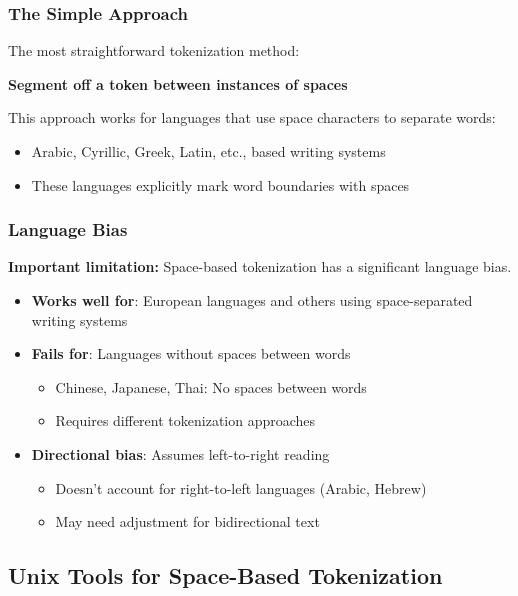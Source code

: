 \documentclass[11pt,a4paper]{article}
\theoremstyle{definition}
\theoremstyle{plain}
\theoremstyle{remark}
\begin{document}
\subsubsection{The Simple Approach}

The most straightforward tokenization method:

\textbf{Segment off a token between instances of spaces}

This approach works for languages that use space characters to separate words:
\begin{itemize}
    \item Arabic, Cyrillic, Greek, Latin, etc., based writing systems
    \item These languages explicitly mark word boundaries with spaces
\end{itemize}

\subsubsection{Language Bias}

\textbf{Important limitation:} Space-based tokenization has a significant language bias.

\begin{itemize}
    \item \textbf{Works well for}: European languages and others using space-separated writing systems
    \item \textbf{Fails for}: Languages without spaces between words
    \begin{itemize}
        \item Chinese, Japanese, Thai: No spaces between words
        \item Requires different tokenization approaches
    \end{itemize}
    \item \textbf{Directional bias}: Assumes left-to-right reading
    \begin{itemize}
        \item Doesn't account for right-to-left languages (Arabic, Hebrew)
        \item May need adjustment for bidirectional text
    \end{itemize}
\end{itemize}

\subsection{Unix Tools for Space-Based Tokenization}
\end{document}
